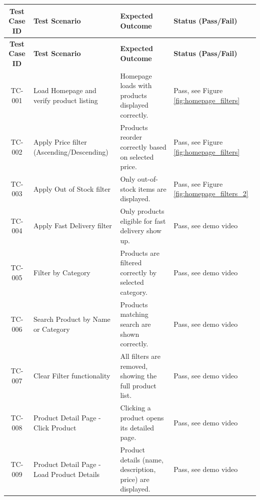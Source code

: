 \documentclass{llncs}
\begin{document}
\renewcommand{\arraystretch}{1.3}
\begin{longtable}{|c|>{\raggedright}p{4.8cm}|p{6cm}|>{\centering\arraybackslash}p{2cm}|}
    \hline
    \textbf{Test Case ID} & \textbf{Test Scenario}                     & \textbf{Expected Outcome}                                 & \textbf{Status (Pass/Fail)}                   \\ \hline
    \endfirsthead
    \hline
    \textbf{Test Case ID} & \textbf{Test Scenario}                     & \textbf{Expected Outcome}                                 & \textbf{Status (Pass/Fail)}                   \\ \hline
    \endhead
    TC-001                & Load Homepage and verify product listing   & Homepage loads with products displayed correctly.         & Pass, see Figure \ref{fig:homepage_filters}   \\ \hline
    TC-002                & Apply Price filter (Ascending/Descending)  & Products reorder correctly based on selected price.       & Pass, see Figure \ref{fig:homepage_filters}   \\ \hline
    TC-003                & Apply Out of Stock filter                  & Only out-of-stock items are displayed.                    & Pass, see Figure \ref{fig:homepage_filters_2} \\ \hline
    TC-004                & Apply Fast Delivery filter                 & Only products eligible for fast delivery show up.         & Pass, see demo video        \\ \hline
    TC-005                & Filter by Category                         & Products are filtered correctly by selected category.     & Pass, see demo video       \\ \hline
    TC-006                & Search Product by Name or Category         & Products matching search are shown correctly.             & Pass, see demo video        \\ \hline
    TC-007                & Clear Filter functionality                 & All filters are removed, showing the full product list.   & Pass, see demo video        \\ \hline
    TC-008                & Product Detail Page - Click Product        & Clicking a product opens its detailed page.               & Pass, see demo video        \\ \hline
    TC-009                & Product Detail Page - Load Product Details & Product details (name, description, price) are displayed. & Pass, see demo video         \\ \hline

\end{longtable}
\end{document}
